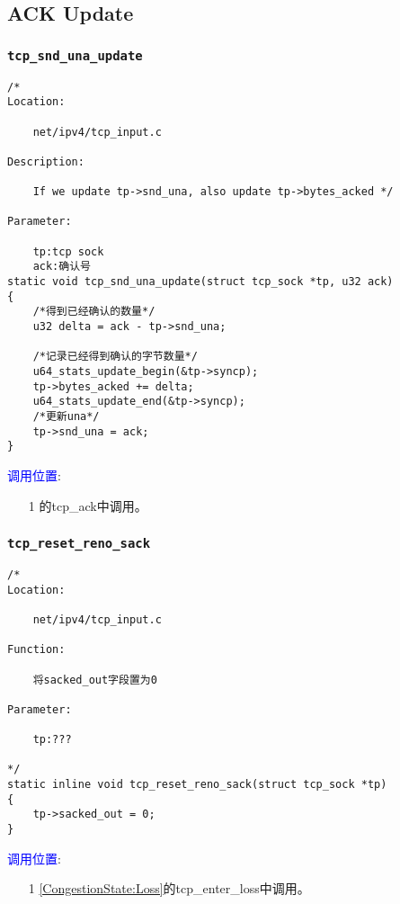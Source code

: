     \subsection{ACK Update}
        \subsubsection{\texttt{tcp_snd_una_update}}
            \label{ACKUpdate:tcp_snd_una_update}
\begin{verbatim}
/* 
Location:

    net/ipv4/tcp_input.c

Description:

    If we update tp->snd_una, also update tp->bytes_acked */

Parameter:
    
    tp:tcp sock
    ack:确认号
static void tcp_snd_una_update(struct tcp_sock *tp, u32 ack)
{
    /*得到已经确认的数量*/
    u32 delta = ack - tp->snd_una;

    /*记录已经得到确认的字节数量*/
    u64_stats_update_begin(&tp->syncp);
    tp->bytes_acked += delta;
    u64_stats_update_end(&tp->syncp);
    /*更新una*/
    tp->snd_una = ack;
}
\end{verbatim}

        \textcolor{blue}{调用位置}:
            \begin{enumerate}
                \item[1]        \label{ClientReceiveSYN+ACK:tcp_ack}的tcp\_ack中调用。
            \end{enumerate}

        \subsubsection{\texttt{tcp_reset_reno_sack}}
            \label{ACKUpdate:tcp_reset_reno_sack}
\begin{verbatim}
/*
Location:

    net/ipv4/tcp_input.c

Function:

    将sacked_out字段置为0

Parameter:

    tp:???

*/
static inline void tcp_reset_reno_sack(struct tcp_sock *tp)
{
    tp->sacked_out = 0;
}
\end{verbatim}    

        \textcolor{blue}{调用位置}:
            \begin{enumerate}
                \item[1]        \ref{CongestionState:Loss}的tcp\_enter\_loss中调用。
            \end{enumerate}

